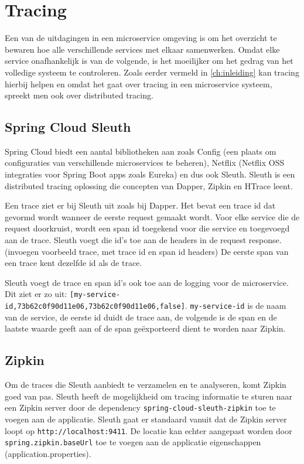 \section{Tracing}
\label{sec:tracing}

Een van de uitdagingen in een microservice omgeving is om het overzicht te bewaren hoe alle verschillende services met elkaar samenwerken. Omdat elke service onafhankelijk is van de volgende, is het moeilijker om het gedrag van het volledige systeem te controleren. Zoals eerder vermeld in \ref{ch:inleiding} kan tracing hierbij helpen en omdat het gaat over tracing in een microservice systeem, spreekt men ook over distributed tracing.

\subsection{Spring Cloud Sleuth}
\label{sec:sleuth}

Spring Cloud biedt een aantal bibliotheken aan zoals Config (een plaats om configuraties van verschillende microservices te beheren), Netflix (Netflix OSS integraties voor Spring Boot apps zoals Eureka) en dus ook Sleuth. Sleuth is een distributed tracing oplossing die concepten van Dapper, Zipkin en HTrace leent.

Een trace ziet er bij Sleuth uit zoals bij Dapper. Het bevat een trace id dat gevormd wordt wanneer de eerste request gemaakt wordt. Voor elke service die de request doorkruist, wordt een span id toegekend voor die service en toegevoegd aan de trace. Sleuth voegt die id's toe aan de headers in de request response. (invoegen voorbeeld trace, met trace id en span id headers) De eerste span van een trace kent dezelfde id als de trace.

Sleuth voegt de trace en span id's ook toe aan de logging voor de microservice. Dit ziet er zo uit: \texttt{[my-service-id,73b62c0f90d11e06,73b62c0f90d11e06,false]}. \texttt{my-service-id} is de naam van de service, de eerste id duidt de trace aan, de volgende is de span en de laatste waarde geeft aan of de span geëxporteerd dient te worden naar Zipkin.

\subsection{Zipkin}
\label{sec:zipkin}

Om de traces die Sleuth aanbiedt te verzamelen en te analyseren, komt Zipkin goed van pas. Sleuth heeft de mogelijkheid om tracing informatie te sturen naar een Zipkin server door de dependency \texttt{spring-cloud-sleuth-zipkin} toe te voegen aan de applicatie. Sleuth gaat er standaard vanuit dat de Zipkin server loopt op \texttt{http://localhost:9411}. De locatie kan echter aangepast worden door \texttt{spring.zipkin.baseUrl} toe te voegen aan de applicatie eigenschappen (application.properties).


